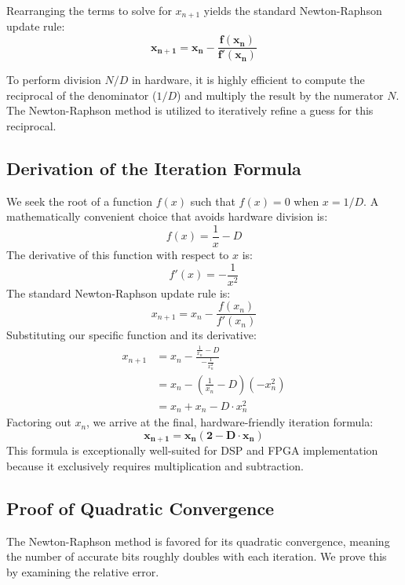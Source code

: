 \documentclass{article}
\begin{document}
Rearranging the terms to solve for $x_{n+1}$ yields the standard Newton-Raphson update rule:
\begin{equation}
    \mathbf{x_{n+1} = x_n - \frac{f(x_n)}{f'(x_n)}}
\end{equation}

To perform division $N/D$ in hardware, it is highly efficient to compute the reciprocal of the denominator ($1/D$) and multiply the result by the numerator $N$. The Newton-Raphson method is utilized to iteratively refine a guess for this reciprocal.

\subsection{Derivation of the Iteration Formula}
We seek the root of a function $f(x)$ such that $f(x) = 0$ when $x = 1/D$. A mathematically convenient choice that avoids hardware division is:
\begin{equation}
    f(x) = \frac{1}{x} - D
\end{equation}
The derivative of this function with respect to $x$ is:
\begin{equation}
    f'(x) = -\frac{1}{x^2}
\end{equation}
The standard Newton-Raphson update rule is:
\begin{equation}
    x_{n+1} = x_n - \frac{f(x_n)}{f'(x_n)}
\end{equation}
Substituting our specific function and its derivative:
\begin{align*}
    x_{n+1} &= x_n - \frac{\frac{1}{x_n} - D}{-\frac{1}{x_n^2}} \\
    &= x_n - \left( \frac{1}{x_n} - D \right)(-x_n^2) \\
    &= x_n + x_n - D \cdot x_n^2
\end{align*}
Factoring out $x_n$, we arrive at the final, hardware-friendly iteration formula:
\begin{equation}
    \mathbf{x_{n+1} = x_n(2 - D \cdot x_n)}
\end{equation}
This formula is exceptionally well-suited for DSP and FPGA implementation because it exclusively requires multiplication and subtraction.

\subsection{Proof of Quadratic Convergence}
The Newton-Raphson method is favored for its quadratic convergence, meaning the number of accurate bits roughly doubles with each iteration. We prove this by examining the relative error.
\end{document}
